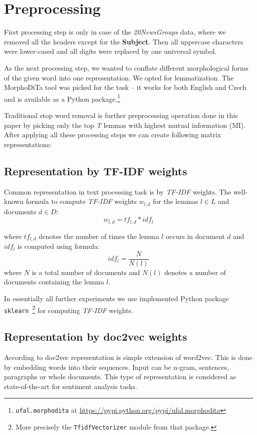 \documentclass[runningheads,a4paper]{llncs}
\begin{document}
\section{Preprocessing}
\label{sec:preproc}
First processing step is only in case of the \emph{20NewsGroups} data, where we removed all the headers except for the \textbf{Subject}. Then all uppercase characters were lower-cased and all digits were replaced by one universal symbol. 

As the next processing step, we wanted to conflate different morphological forms of the given word into one representation. We opted for lemmatization. The MorphoDiTa \cite{Morp} tool was picked for the task -- it works for both English and Czech and is available as a Python package.\footnote{\texttt{ufal.morphodita} at \url{https://pypi.python.org/pypi/ufal.morphodita}} 

Traditional stop word removal is further preprocessing operation done in this paper by picking only the top \emph{T} lemmas with highest mutual information (MI). \\

After applying all these processing steps we can create following matrix representations:
\subsection{Representation by TF-IDF weights}
\label{sec:tfidf}
Common representation in text processing task is by \emph{TF-IDF} weights. The well-known formula to compute \emph{TF-IDF} weights $w_{l,d}$ for the lemmas $l \in L$ and documents $d \in D$:
\begin{equation}
w_{l,d} = tf_{l,d} * idf_l
\label{tfidf}
\end{equation}

where $tf_{l,d}$ denotes the number of times the lemma $l$ occurs in document $d$ and $idf_l$ is computed using formula:
\begin{equation}
idf_l = \frac{N}{N(l)}
\label{idf}
\end{equation}
where $N$ is a total number of documents and $N(l)$ denotes a number of documents containing the lemma $l$.

In essentially all further experiments we use implemented Python package \texttt{sklearn}~\cite{skl}\footnote{More precisely the \texttt{TfidfVectorizer} module from that package.} for computing \emph{TF-IDF} weights. 
\subsection{Representation by doc2vec weights}
\label{sec:d2v}
According to \cite{lau2016empirical} doc2vec representation is simple extension of word2vec. This is done by embedding words into their sequences. Input can be n-gram, sentences, paragraphs or whole documents. This type of representation is considered as state-of-the-art for sentiment analysis tasks. 
\end{document}
